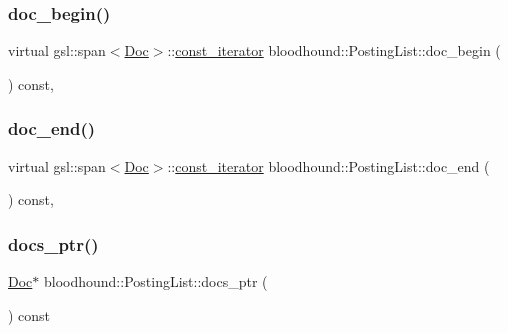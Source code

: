 \mbox{\label{classbloodhound_1_1PostingList_aac3dbe7fbf43ce93031e97b16bcfc888}} 
\subsubsection{\texorpdfstring{doc\+\_\+begin()}{doc\_begin()}}
{\footnotesize\ttfamily virtual gsl\+::span$<$\mbox{\hyperlink{structbloodhound_1_1Doc}{Doc}}$>$\+::\mbox{\hyperlink{structbloodhound_1_1PostingList_1_1const__iterator}{const\+\_\+iterator}} bloodhound\+::\+Posting\+List\+::doc\+\_\+begin (\begin{DoxyParamCaption}{ }\end{DoxyParamCaption}) const\hspace{0.3cm}{\ttfamily [inline]}, {\ttfamily [virtual]}}

\mbox{\label{classbloodhound_1_1PostingList_aac468540b0a376d9b378a4333546245c}} 
\subsubsection{\texorpdfstring{doc\+\_\+end()}{doc\_end()}}
{\footnotesize\ttfamily virtual gsl\+::span$<$\mbox{\hyperlink{structbloodhound_1_1Doc}{Doc}}$>$\+::\mbox{\hyperlink{structbloodhound_1_1PostingList_1_1const__iterator}{const\+\_\+iterator}} bloodhound\+::\+Posting\+List\+::doc\+\_\+end (\begin{DoxyParamCaption}{ }\end{DoxyParamCaption}) const\hspace{0.3cm}{\ttfamily [inline]}, {\ttfamily [virtual]}}

\mbox{\label{classbloodhound_1_1PostingList_acfca9e8ad1fd94461b56390fdd60779f}} 
\subsubsection{\texorpdfstring{docs\+\_\+ptr()}{docs\_ptr()}}
{\footnotesize\ttfamily \mbox{\hyperlink{structbloodhound_1_1Doc}{Doc}}$\ast$ bloodhound\+::\+Posting\+List\+::docs\+\_\+ptr (\begin{DoxyParamCaption}{ }\end{DoxyParamCaption}) const\hspace{0.3cm}{\ttfamily [inline]}}


